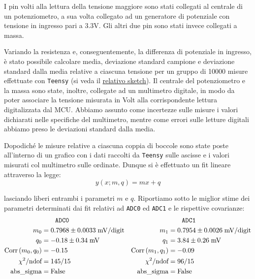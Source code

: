 \documentclass{article}[a4paper, oneside, 11pt]
\begin{document}
I pin volti alla lettura della tensione maggiore sono stati collegati al 
centrale di un potenziometro, a sua volta collegato ad un generatore di 
potenziale con tensione in ingresso pari a $3.3\si{\V}$. Gli altri due pin
sono stati invece collegati a massa.

Variando la resistenza e, conseguentemente, la differenza di potenziale in 
ingresso, \`e stato possibile calcolare media, deviazione standard campione
e deviazione standard dalla media relative a ciascuna tensione per 
un gruppo di 10000 misure effettuate con \verb+Teensy+ (si veda il 
\href{https://github.com/LucaCiucci/relaz_seme/blob/master/sketches/teensy_calib/teensy_calib.ino}{relativo sketch}).
Il centrale del potenziometro e la massa sono state, inoltre, collegate ad un
multimetro digitale, in modo da poter associare la tensione misurata in
Volt alla corrispondente lettura digitalizzata dal MCU. Abbiamo assunto come
incertezze sulle misure i valori dichiarati nelle specifiche del multimetro,
mentre come errori sulle letture digitali abbiamo preso le deviazioni standard
dalla media.

Dopodich\'e le misure relative a ciascuna coppia di boccole sono state poste 
all’interno di un grafico con i dati raccolti da \verb+Teensy+ sulle ascisse
e i valori misurati col multimetro sulle ordinate. Dunque si \`e effettuato un
fit lineare attraverso la legge:
\begin{equation}
y(x; m, q)  = m x + q
\end{equation}

lasciando liberi entrambi i parametri $m$ e $q$. Riportiamo sotto le miglior
stime dei parametri determinati dai fit relativi ad \verb+ADC0+ ed \verb+ADC1+ 
e le rispettive covarianze:
\begin{align*}
&\qquad \texttt{ADC0}	&&\qquad  \texttt{ADC1} \\
m_0 &= 0.7968 \pm  0.0033  \; \mathrm{mV/digit} 
& m_1  &= 0.7954 \pm 0.0026  \; \mathrm{mV/digit} \\
q_0 &= - 0.18 \pm 0.34  \; \si{\mV} 	
&q_1 &= 3.84  \pm 0.26  \; \si{\mV} \\
\corr{m_0} {q_0} &= - 0.15      &\corr{m_1}{q_1} &= - 0.09 \\
\chi^2/\text{ndof} &= 145/15	&\chi^2/\text{ndof} &= 96/15 \\ 
\text{abs\_sigma} &= \rm False	&\text{abs\_sigma} &= \rm False
\end{align*}

\begin{figure}[H]
\centering
\begin{subfigure}{.5\textwidth}
	\def\svgwidth{\columnwidth}
	
\label{fig: cal0}
\end{subfigure}%
\begin{subfigure}{.5\textwidth}
	\def\svgwidth{\columnwidth}
	
\label{fig: cal1}
\end{subfigure}
\end{figure}
\end{document}
